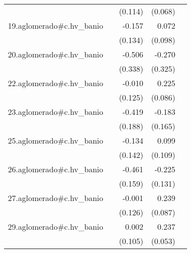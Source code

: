 {\begin{longtable}{l*{4}{D{.}{.}{-1}}}
            &                     &     (0.114)         &     (0.068)         &                     \\
\addlinespace
19.aglomerado#c.hv\_banio&                     &      -0.157         &       0.072         &                     \\
            &                     &     (0.134)         &     (0.098)         &                     \\
\addlinespace
20.aglomerado#c.hv\_banio&                     &      -0.506         &      -0.270         &                     \\
            &                     &     (0.338)         &     (0.325)         &                     \\
\addlinespace
22.aglomerado#c.hv\_banio&                     &      -0.010         &       0.225\sym{**} &                     \\
            &                     &     (0.125)         &     (0.086)         &                     \\
\addlinespace
23.aglomerado#c.hv\_banio&                     &      -0.419\sym{*}  &      -0.183         &                     \\
            &                     &     (0.188)         &     (0.165)         &                     \\
\addlinespace
25.aglomerado#c.hv\_banio&                     &      -0.134         &       0.099         &                     \\
            &                     &     (0.142)         &     (0.109)         &                     \\
\addlinespace
26.aglomerado#c.hv\_banio&                     &      -0.461\sym{**} &      -0.225         &                     \\
            &                     &     (0.159)         &     (0.131)         &                     \\
\addlinespace
27.aglomerado#c.hv\_banio&                     &      -0.001         &       0.239\sym{**} &                     \\
            &                     &     (0.126)         &     (0.087)         &                     \\
\addlinespace
29.aglomerado#c.hv\_banio&                     &       0.002         &       0.237\sym{***}&                     \\
            &                     &     (0.105)         &     (0.053)         &                     \\

\end{longtable}}
